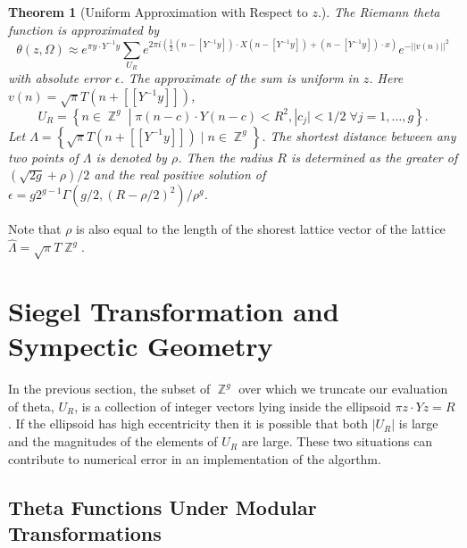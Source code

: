 \documentclass[12]{article}
\newtheorem{theorem}{Theorem}
\DeclareMathOperator{\ZZ}{\mathbb{Z}}
\begin{document}
\begin{theorem}[Uniform Approximation with Respect to $z$.]
The Riemann theta function is approximated by
\begin{equation} \label{eqn: uniform}
  \theta(z,\Omega)
  \approx
  e^{\pi y \cdot Y^{-1} y}
  \sum_{U_R} e^{2 \pi i \left( \tfrac{1}{2} \left( n - [Y^{-1}y] \right)
    \cdot X \left( n - [Y^{-1}y] \right) +
    \left( n - [Y^{-1}y] \right) \cdot x \right)}
    e^{- ||v(n)||^2}
\end{equation}
with absolute error $\epsilon$. The approximate of the sum is uniform in $z$.
Here $v(n) = \sqrt{\pi} T \left( n + [[Y^{-1}y]] \right)$,
\begin{equation} \label{eqn: uniform points}
  U_R = \left\{ n \in \ZZ^g \; | \; \pi (n-c) \cdot Y (n-c) < R^2,
                |c_j| < 1/2 \; \forall j = 1,\ldots,g \right\}.
\end{equation}
Let $\Lambda = \left\{ \sqrt{\pi}T \left( n + [[Y^{-1}y]] \right) \; | \; n \in
\ZZ^g \right\}$. The shortest distance between any two points of $\Lambda$ is
denoted by $\rho$. Then the radius $R$ is determined as the greater of
$(\sqrt{2g} + \rho)/2$ and the real positive solution of $\epsilon =
g2^{g-1}\Gamma(g/2,(R-\rho/2)^2)/\rho^g$.
\end{theorem}


Note that $\rho$ is also equal to the length of the shorest lattice vector of
the lattice $\hat{\Lambda} = \sqrt{\pi}T\ZZ^g$.


\section{Siegel Transformation and Sympectic Geometry}



In the previous section, the subset of $\ZZ^g$ over which we truncate our
evaluation of theta, $U_R$, is a collection of integer vectors lying inside the
ellipsoid $\pi z \cdot Yz = R$. If the ellipsoid has high eccentricity then it
is possible that both $|U_R|$ is large and the magnitudes of the elements of
$U_R$ are large. These two situations can contribute to numerical error in an
implementation of the algorthm.




\subsection{Theta Functions Under Modular Transformations}
\end{document}
